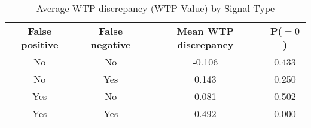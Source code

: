 \begin{table}[H]\centering \caption{Average WTP discrepancy (WTP-Value) by Signal Type} \label{WTP_nonpar} \begin{tabular}{cccc} \hline \hline
\multirow{2}{12ex}{\centering \textbf{False positive}}&\multirow{2}{12ex}{\centering \textbf{False negative}}&\multirow{2}{15ex}{\textbf{\centering Mean WTP discrepancy}}& \multirow{2}{10ex}{\centering \textbf{P($=0$)}}\\ 
\\
\hline
No&No&-0.106&0.433\\
No&Yes&0.143&0.250\\
Yes&No&0.081&0.502\\
Yes&Yes&0.492&0.000\\
\hline \end{tabular} \end{table}
